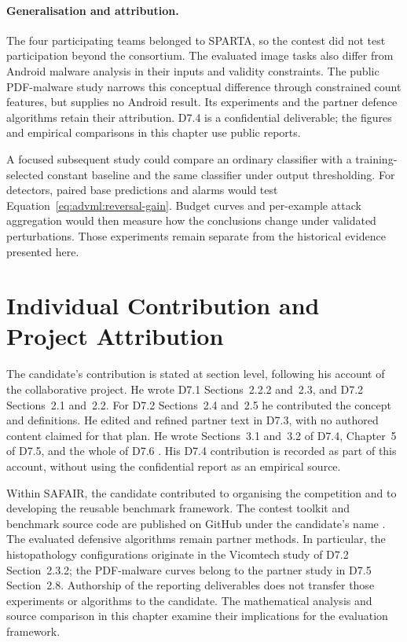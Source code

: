 \paragraph{Generalisation and attribution.} The four participating teams belonged to SPARTA,
so the contest did not test participation beyond the consortium. The evaluated image tasks
also differ from Android malware analysis in their inputs and validity constraints. The
public PDF-malware study narrows this conceptual difference through constrained count
features, but supplies no Android result. Its experiments and the partner defence algorithms
retain their attribution. D7.4 is a confidential deliverable; the figures and empirical
comparisons in this chapter use public reports.

A focused subsequent study could compare an ordinary classifier with a training-selected
constant baseline and the same classifier under output thresholding. For detectors, paired
base predictions and alarms would test Equation~\ref{eq:advml:reversal-gain}. Budget curves
and per-example attack aggregation would then measure how the conclusions change under
validated perturbations. Those experiments remain separate from the historical evidence
presented here.

\section{Individual Contribution and Project Attribution}
\label{sec:advml:10}

The candidate's contribution is stated at section level, following his account of the
collaborative project. He wrote D7.1 Sections~2.2.2 and~2.3, and D7.2 Sections~2.1 and~2.2.
For D7.2 Sections~2.4 and~2.5 he contributed the concept and definitions. He edited and
refined partner text in D7.3, with no authored content claimed for that plan. He wrote
Sections~3.1 and~3.2 of D7.4, Chapter~5 of D7.5, and the whole of D7.6
\cite{sparta2021d71,sparta2020d72,sparta2021d73,sparta2021d75,sparta2022d76}.
His D7.4 contribution is recorded as part of this account, without using the confidential
report as an empirical source.

Within SAFAIR, the candidate contributed to organising the competition and to developing the
reusable benchmark framework. The contest toolkit and benchmark source code are published on
GitHub under the candidate's name
\cite{norouzian2021safairtoolkit,norouzian2021adversarialbenchmark}. The evaluated defensive
algorithms remain partner methods. In particular, the histopathology configurations originate
in the Vicomtech study of D7.2 Section~2.3.2; the PDF-malware curves belong to the partner
study in D7.5 Section~2.8. Authorship of the reporting deliverables does not transfer those
experiments or algorithms to the candidate. The mathematical analysis and source comparison
in this chapter examine their implications for the evaluation framework.

